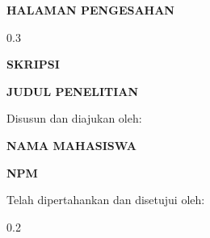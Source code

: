 \thispagestyle{empty}
\begin{tengah}
\textbf{HALAMAN PENGESAHAN}
\end{tengah}
\begin{ruang}{0.3}\end{ruang}
\begin{tengah}
\textbf{SKRIPSI}

\textbf{JUDUL PENELITIAN}

Disusun dan diajukan oleh:

\textbf{NAMA MAHASISWA}

\textbf{NPM}

Telah dipertahankan dan disetujui oleh:
\end{tengah}
\begin{ruang}{0.2}\end{ruang}
